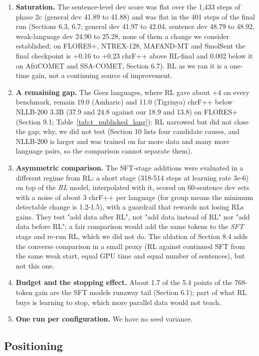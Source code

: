 \begin{enumerate}
\item
  \textbf{Saturation.} The sentence-level dev score was flat over the 1,433 steps of phase 2c (general dev 41.89 to 41.88) and was flat in the 401 steps of the final run (Sections 6.3, 6.7; general dev 41.97 to 42.04, sentence dev 48.79 to 48.92, weak-language dev 24.90 to 25.28, none of them a change we consider established; on FLORES+, NTREX-128, MAFAND-MT and SmolSent the final checkpoint is +0.16 to +0.23 chrF++ above RL-final and 0.002 below it on AfriCOMET and SSA-COMET, Section 6.7). RL as we ran it is a one-time gain, not a continuing source of improvement.
\item
  \textbf{A remaining gap.} The Ge\textquotesingle ez languages, where RL gave about +4 on every benchmark, remain 19.0 (Amharic) and 11.0 (Tigrinya) chrF++ below NLLB-200 3.3B (37.9 and 24.8 against our 18.9 and 13.8) on FLORES+ (Section 9.1; Table~\ref{tab:t_published_lang}): RL narrowed but did not close the gap; why, we did not test (Section 10 lists four candidate causes, and NLLB-200 is larger and was trained on far more data and many more language pairs, so the comparison cannot separate them).
\item
  \textbf{Asymmetric comparison.} The SFT-stage additions were evaluated in a different regime from RL: a short stage (318-514 steps at learning rate 3e-6) on top of the \emph{RL} model, interpolated with it, scored on 60-sentence dev sets with a noise of about 3 chrF++ per language (for group means the minimum detectable change is 1.2-1.5), with a guardrail that rewards not losing RL\textquotesingle s gains. They test "add data after RL", not "add data instead of RL" nor "add data before RL"; a fair comparison would add the same tokens to the \emph{SFT} stage and re-run RL, which we did not do. The ablation of Section 8.4 adds the converse comparison in a small proxy (RL against continued SFT from the same weak start, equal GPU time and equal number of sentences), but not this one.
\item
  \textbf{Budget and the stopping effect.} About 1.7 of the 5.4 points of the 768-token gain are the SFT model\textquotesingle s runaway tail (Section 6.1); part of what RL buys is learning to stop, which more parallel data would not teach.
\item
  \textbf{One run per configuration.} We have no seed variance.
\end{enumerate}

\subsection{Positioning}\label{positioning}

